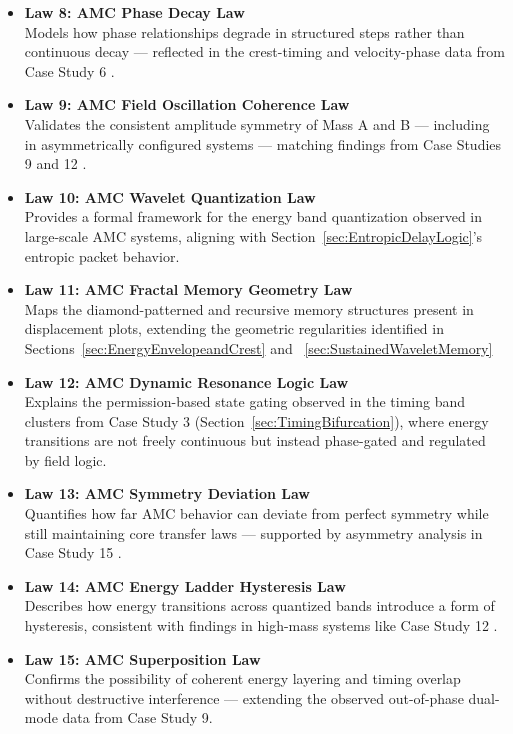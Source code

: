 \documentclass[10pt,aps,pre,onecolumn,superscriptaddress,notitlepage]{revtex4-2}
\begin{document}
\begin{itemize}[leftmargin=1.5em]
\item \textbf{Law 8: AMC Phase Decay Law \cite{karim2025phasedecay}} \\
Models how phase relationships degrade in structured steps rather than continuous decay — reflected in the crest-timing and velocity-phase data from Case Study 6 \cite{karim2025cs6}.

\item \textbf{Law 9: AMC Field Oscillation Coherence Law \cite{karim2025fieldcoherence}} \\
Validates the consistent amplitude symmetry of Mass A and B — including in asymmetrically configured systems — matching findings from Case Studies 9 \cite{karim2025cs9} and 12 \cite{karim2025cs12}.

\item \textbf{Law 10: AMC Wavelet Quantization Law \cite{karim2025waveletquantization}} \\
Provides a formal framework for the energy band quantization observed in large-scale AMC systems, aligning with Section~\ref{sec:EntropicDelayLogic}’s entropic packet behavior.

\item \textbf{Law 11: AMC Fractal Memory Geometry Law \cite{karim2025fractalmemory}} \\
Maps the diamond-patterned and recursive memory structures present in displacement plots, extending the geometric regularities identified in Sections~\ref{sec:EnergyEnvelopeandCrest} and ~\ref{sec:SustainedWaveletMemory}

\item \textbf{Law 12: AMC Dynamic Resonance Logic Law \cite{karim2025dynamicresonance}} \\
Explains the permission-based state gating observed in the timing band clusters from Case Study 3 \cite{karim2025cs3} (Section~\ref{sec:TimingBifurcation}), where energy transitions are not freely continuous but instead phase-gated and regulated by field logic.

\item \textbf{Law 13: AMC Symmetry Deviation Law \cite{karim2025symmetrydeviation}} \\
Quantifies how far AMC behavior can deviate from perfect symmetry while still maintaining core transfer laws — supported by asymmetry analysis in Case Study 15 \cite{karim2025cs15}.

\item \textbf{Law 14: AMC Energy Ladder Hysteresis Law \cite{karim2025energyladder}} \\
Describes how energy transitions across quantized bands introduce a form of hysteresis, consistent with findings in high-mass systems like Case Study 12 \cite{karim2025cs12}.

\item \textbf{Law 15: AMC Superposition Law \cite{karim2025superposition}} \\
Confirms the possibility of coherent energy layering and timing overlap without destructive interference — extending the observed out-of-phase dual-mode data from Case Study 9\cite{karim2025cs9}.

\end{itemize}
\end{document}
